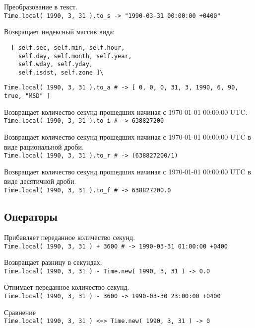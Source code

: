 \begin{methodlist}
  Преобразование в текст. 
  \\\verb!Time.local( 1990, 3, 31 ).to_s -> "1990-03-31 00:00:00 +0400"!
 
  Возвращает индексный массив вида:
  \begin{verbatim}
  [ self.sec, self.min, self.hour,
    self.day, self.month, self.year,
    self.wday, self.yday,
    self.isdst, self.zone ]\
  \end{verbatim}   
  \verb!Time.local( 1990, 3, 31 ).to_a # -> [ 0, 0, 0, 31, 3, 1990, 6, 90, true, "MSD" ]!
 
  Возвращает количество секунд прошедших начиная с 1970-01-01 00:00:00 UTC. 
  \\\verb!Time.local( 1990, 3, 31 ).to_i # -> 638827200!
 
  Возвращает количество секунд прошедших начиная с 1970-01-01 00:00:00 UTC в виде рациональной дроби.
  \\\verb!Time.local( 1990, 3, 31 ).to_r # -> (638827200/1)!
 
  Возвращает количество секунд прошедших начиная с 1970-01-01 00:00:00 UTC в виде десятичной дроби.
  \\\verb!Time.local( 1990, 3, 31 ).to_f # -> 638827200.0!
\end{methodlist}

\subsection*{Операторы}

\begin{methodlist}
  Прибавляет переданное количество секунд. 
  \\\verb!Time.local( 1990, 3, 31 ) + 3600 # -> 1990-03-31 01:00:00 +0400!
 
  Возвращает разницу в секундах.
  \\\verb!Time.local( 1990, 3, 31 ) - Time.new( 1990, 3, 31 ) -> 0.0!

  Отнимает переданное количество секунд. 
  \\\verb!Time.local( 1990, 3, 31 ) - 3600 -> 1990-03-30 23:00:00 +0400 !
 
  Сравнение 
  \\\verb!Time.local( 1990, 3, 31 ) <=> Time.new( 1990, 3, 31 ) -> 0!
\end{methodlist}


